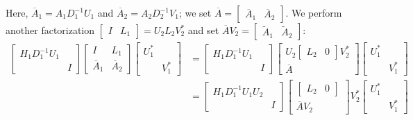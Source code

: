 \noindent
Here, $\overline{A}_{1} = A_{1}D_{1}^{-1}U_{1}$
and $\overline{A}_{2} = A_{2}D_{2}^{-1}V_{1}$;
we set $\overline{A} = \begin{bmatrix} \overline{A}_{1} & \overline{A}_{2}
\end{bmatrix}$.
We perform another factorization
$\begin{bmatrix} I & L_{1} \end{bmatrix} = U_{2}L_{2}V_{2}^{*}$
and set $\overline{A}V_{2} =
\begin{bmatrix} \widetilde{A}_{1} & \widetilde{A}_{2} \end{bmatrix}$:
%
\begin{align}
    \begin{bmatrix}H_{1}D_{1}^{-1}U_{1} & \\ & I \end{bmatrix}
        \begin{bmatrix} I  & L_{1} \\
        \overline{A}_{1} & \overline{A}_{2} \end{bmatrix}
        \begin{bmatrix} U_{1}^{*} & \\ & V_{1}^{*} \end{bmatrix}
    &= \begin{bmatrix}H_{1}D_{1}^{-1}U_{1} & \\ & I \end{bmatrix}
        \begin{bmatrix} U_{2}\begin{bmatrix}L_{2} & 0 \end{bmatrix} V_{2}^{*}
            \\
        \overline{A} \end{bmatrix}
        \begin{bmatrix} U_{1}^{*} & \\ & V_{1}^{*} \end{bmatrix}
        \nonumber\\
    &= \begin{bmatrix}H_{1}D_{1}^{-1}U_{1}U_{2} & \\ & I \end{bmatrix}
        \begin{bmatrix} \begin{bmatrix}L_{2} & 0 \end{bmatrix} \\
        \overline{A}V_{2} \end{bmatrix}
        V_{2}^{*}\begin{bmatrix} U_{1}^{*} & \\ & V_{1}^{*} \end{bmatrix}

\end{align}
